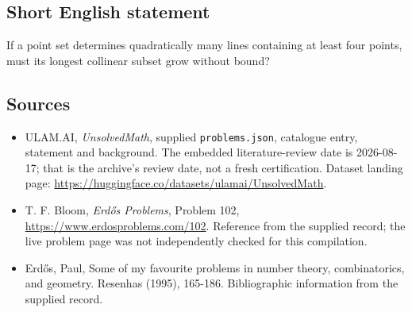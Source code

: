 \documentclass[11pt,a4paper]{article}
\begin{document}
\subsection{Short English statement}

If a point set determines quadratically many lines containing at least four points, must its longest collinear subset grow without bound?

\subsection{Sources}

{\small

\begin{itemize}

\item[\hypertarget{source:statement:1}{S1}] ULAM.AI, \emph{UnsolvedMath}, supplied \texttt{problems.json}, catalogue entry, statement and background. The embedded literature-review date is 2026-08-17; that is the archive’s review date, not a fresh certification. Dataset landing page: \url{https://huggingface.co/datasets/ulamai/UnsolvedMath}.

\item[\hypertarget{source:statement:2}{S2}] T. F. Bloom, \emph{Erdős Problems}, Problem 102, \url{https://www.erdosproblems.com/102}. Reference from the supplied record; the live problem page was not independently checked for this compilation.

\item[\hypertarget{source:statement:3}{S3}] Erd\H{o}s, Paul, Some of my favourite problems in number theory, combinatorics, and geometry. Resenhas (1995), 165-186. Bibliographic information from the supplied record.

\end{itemize}

}

\label{end:statement}
\end{document}
